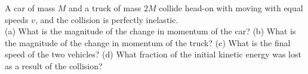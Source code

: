 A car of mass $M$ and a truck of mass $2M$ collide head-on with
moving with equal speeds $v$, and the collision is perfectly inelastic.\\
%
(a) What is the magnitude of the change in momentum of the
car?\answercheck\hwendpart
%
(b) What is the magnitude of the change in momentum of the
truck?\answercheck\hwendpart
%
(c) What is the final speed of the two vehicles?\answercheck\hwendpart
%
(d) What fraction of the initial kinetic energy was lost as a result
of the collision?\answercheck
